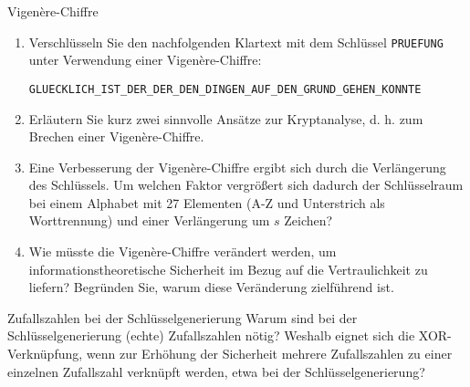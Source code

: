 \documentclass{article}
\begin{document}
\begin{exercise}{Vigenère-Chiffre}
  \begin{enumerate}
      \item Verschlüsseln Sie den nachfolgenden Klartext mit dem Schlüssel \texttt{PRUEFUNG} unter Verwendung einer Vigenère-Chiffre:
      \begin{center}
          \texttt{GLUECKLICH\_IST\_DER\_DER\_DEN\_DINGEN\_AUF\_DEN\_GRUND\_GEHEN\_KONNTE}
      \end{center}
      \item Erläutern Sie kurz zwei sinnvolle Ansätze zur Kryptanalyse, d. h. zum Brechen einer Vigenère-Chiffre.
      \item Eine Verbesserung der Vigenère-Chiffre ergibt sich durch die Verlängerung des Schlüssels. Um welchen Faktor vergrößert sich dadurch der Schlüsselraum bei einem Alphabet mit 27 Elementen (A-Z und Unterstrich als Worttrennung) und einer Verlängerung um $s$ Zeichen?
      \item Wie müsste die Vigenère-Chiffre verändert werden, um informationstheoretische Sicherheit im Bezug auf die Vertraulichkeit zu liefern? Begründen Sie, warum diese Veränderung zielführend ist.
  \end{enumerate}

  \begin{solution}
  \end{solution}
\end{exercise}

\begin{exercise}{Zufallszahlen bei der Schlüsselgenerierung}
  Warum sind bei der Schlüsselgenerierung (echte) Zufallszahlen nötig? Weshalb eignet sich die XOR-Verknüpfung, wenn zur Erhöhung der Sicherheit mehrere Zufallszahlen zu einer einzelnen Zufallszahl verknüpft werden, etwa bei der Schlüsselgenerierung?

  \begin{solution}
  \end{solution}
\end{exercise}
\end{document}
